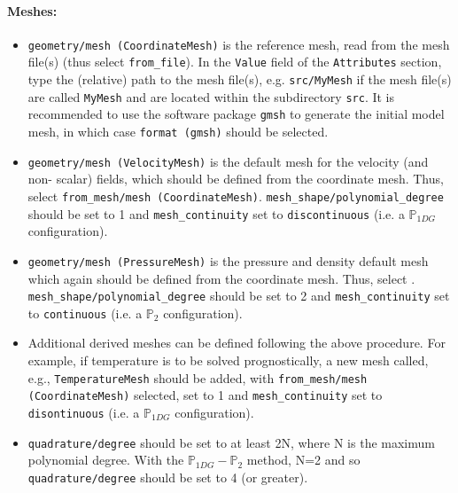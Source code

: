 \documentclass[10pt,a4paper]{article}
\begin{document}
\paragraph{Meshes:}
\begin{itemize}
\item \texttt{geometry/mesh (CoordinateMesh)} is the reference mesh, read from the mesh file(s) (thus select \texttt{from\_file}). In the \texttt{Value} field of the \texttt{Attributes} section, type the (relative) path to the mesh file(s), e.g. \texttt{src/MyMesh} if the mesh file(s) are called \texttt{MyMesh} and are located within the subdirectory \texttt{src}.  It is recommended to use the software package \texttt{gmsh} to generate the initial model mesh, in which case \texttt{format (gmsh)} should  be selected.
\item \texttt{geometry/mesh (VelocityMesh)} is the default mesh for the velocity (and non- scalar) fields, which should be defined from the coordinate mesh. Thus, select \texttt{from\_mesh/mesh (CoordinateMesh)}. \texttt{mesh\_shape/polynomial\_degree} should be set to 1 and \texttt{mesh\_continuity} set to \texttt{discontinuous} (i.e. a $\mathbb{P}_{1DG}$ configuration).
\item \texttt{geometry/mesh (PressureMesh)} is the pressure and density default mesh which again should be defined from the coordinate mesh. Thus, select \texttt{}. \texttt{mesh\_shape/polynomial\_degree} should be set to 2 and \texttt{mesh\_continuity} set to \texttt{continuous} (i.e. a $\mathbb{P}_2$ configuration).
\item Additional derived meshes can be defined following the above procedure. For example, if temperature is to be solved prognostically, a new mesh called, e.g., \texttt{TemperatureMesh} should be added, with \texttt{from\_mesh/mesh (CoordinateMesh)} selected, \texttt{} set to 1 and \texttt{mesh\_continuity} set to \texttt{disontinuous} (i.e. a $\mathbb{P}_{1DG}$ configuration).
\item \texttt{quadrature/degree} should be set to at least 2N, where N is the  maximum polynomial degree. With the $\mathbb{P}_{1DG}-\mathbb{P}_2$ method, N=2 and so \texttt{quadrature/degree} should be set to 4 (or greater).
\end{itemize}
\end{document}
